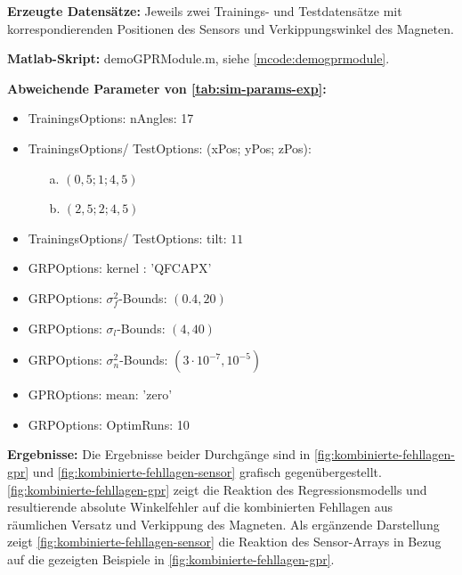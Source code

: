 \textbf{Erzeugte Datensätze:} Jeweils zwei Trainings- und Testdatensätze mit korrespondierenden Positionen des Sensors und Verkippungswinkel des Magneten.

\textbf{Matlab-Skript:} demoGPRModule.m, siehe \autoref{mcode:demogprmodule}.


\clearpage


\textbf{Abweichende Parameter von \autoref{tab:sim-params-exp}:}

\begin{itemize}
	\item TrainingsOptions: nAngles: 17
	\item TrainingsOptions/ TestOptions: (xPos; yPos; zPos): 
	\begin{itemize}
		\item[a.] $(0,5;1;4,5)$
		\item[b.] $(2,5;2;4,5)$
	\end{itemize}
	\item TrainingsOptions/ TestOptions: tilt: $11$
	\item GRPOptions: kernel : 'QFCAPX'
	\item GRPOptions: $\sigma_f^2$-Bounds: $(0.4,20)$
	\item GRPOptions: $\sigma_l$-Bounds: $(4,40)$
	\item GRPOptions: $\sigma_n^2$-Bounds: $(3\cdot10^{-7},10^{-5})$
	\item GPROptions: mean: 'zero'
	\item GRPOptions: OptimRuns: 10
\end{itemize}

\textbf{Ergebnisse:} Die Ergebnisse beider Durchgänge sind in \autoref{fig:kombinierte-fehllagen-gpr} und \autoref{fig:kombinierte-fehllagen-sensor} grafisch gegenübergestellt. \autoref{fig:kombinierte-fehllagen-gpr} zeigt die Reaktion des Regressionsmodells und resultierende absolute Winkelfehler auf die kombinierten Fehllagen aus räumlichen Versatz und Verkippung des Magneten. Als ergänzende Darstellung zeigt \autoref{fig:kombinierte-fehllagen-sensor} die Reaktion des Sensor-Arrays in Bezug auf die gezeigten Beispiele in \autoref{fig:kombinierte-fehllagen-gpr}.


\clearpage


